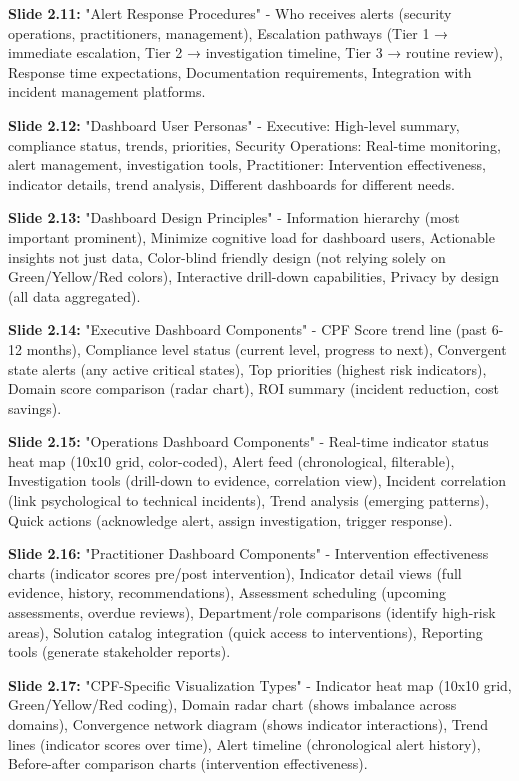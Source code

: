 \documentclass[11pt,a4paper]{article}
\begin{document}
\textbf{Slide 2.11:} "Alert Response Procedures" - Who receives alerts (security operations, practitioners, management), Escalation pathways (Tier 1 → immediate escalation, Tier 2 → investigation timeline, Tier 3 → routine review), Response time expectations, Documentation requirements, Integration with incident management platforms.

\textbf{Slide 2.12:} "Dashboard User Personas" - Executive: High-level summary, compliance status, trends, priorities, Security Operations: Real-time monitoring, alert management, investigation tools, Practitioner: Intervention effectiveness, indicator details, trend analysis, Different dashboards for different needs.

\textbf{Slide 2.13:} "Dashboard Design Principles" - Information hierarchy (most important prominent), Minimize cognitive load for dashboard users, Actionable insights not just data, Color-blind friendly design (not relying solely on Green/Yellow/Red colors), Interactive drill-down capabilities, Privacy by design (all data aggregated).

\textbf{Slide 2.14:} "Executive Dashboard Components" - CPF Score trend line (past 6-12 months), Compliance level status (current level, progress to next), Convergent state alerts (any active critical states), Top priorities (highest risk indicators), Domain score comparison (radar chart), ROI summary (incident reduction, cost savings).

\textbf{Slide 2.15:} "Operations Dashboard Components" - Real-time indicator status heat map (10x10 grid, color-coded), Alert feed (chronological, filterable), Investigation tools (drill-down to evidence, correlation view), Incident correlation (link psychological to technical incidents), Trend analysis (emerging patterns), Quick actions (acknowledge alert, assign investigation, trigger response).

\textbf{Slide 2.16:} "Practitioner Dashboard Components" - Intervention effectiveness charts (indicator scores pre/post intervention), Indicator detail views (full evidence, history, recommendations), Assessment scheduling (upcoming assessments, overdue reviews), Department/role comparisons (identify high-risk areas), Solution catalog integration (quick access to interventions), Reporting tools (generate stakeholder reports).

\textbf{Slide 2.17:} "CPF-Specific Visualization Types" - Indicator heat map (10x10 grid, Green/Yellow/Red coding), Domain radar chart (shows imbalance across domains), Convergence network diagram (shows indicator interactions), Trend lines (indicator scores over time), Alert timeline (chronological alert history), Before-after comparison charts (intervention effectiveness).
\end{document}
